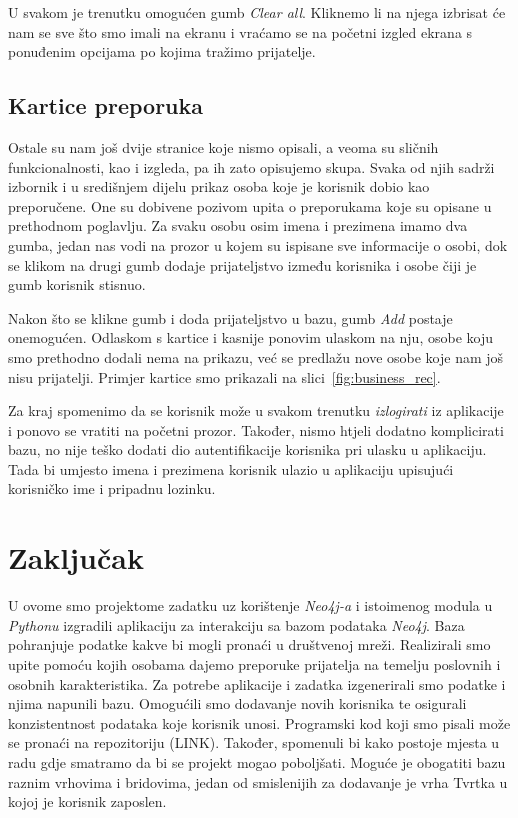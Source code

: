 \documentclass[titlepage, 12pt]{scrartcl}
\begin{document}
	U svakom je trenutku omogućen gumb \emph{Clear all}. Kliknemo li na njega izbrisat će nam se sve što smo imali na ekranu i vraćamo se na početni izgled ekrana s ponuđenim opcijama po kojima tražimo prijatelje.
	
	
	\subsection{Kartice preporuka}
	
	Ostale su nam još dvije stranice koje nismo opisali, a veoma su sličnih funkcionalnosti, kao i izgleda, pa ih zato opisujemo skupa. Svaka od njih sadrži izbornik i u središnjem dijelu prikaz osoba koje je korisnik dobio kao preporučene. One su dobivene pozivom upita o preporukama koje su opisane u prethodnom poglavlju. Za svaku osobu osim imena i prezimena imamo dva gumba, jedan nas vodi na prozor u kojem su ispisane sve informacije o osobi, dok se klikom na drugi gumb dodaje prijateljstvo između korisnika i osobe čiji je gumb korisnik stisnuo.
	
	Nakon što se klikne gumb i doda prijateljstvo u bazu, gumb \emph{Add} postaje onemogućen. Odlaskom s kartice i kasnije ponovim ulaskom na nju, osobe koju smo prethodno dodali nema na prikazu, već se predlažu nove osobe koje nam još nisu prijatelji. Primjer kartice smo prikazali na slici~\ref{fig:business_rec}.
	
	Za kraj spomenimo da se korisnik može u svakom trenutku \emph{izlogirati} iz aplikacije i ponovo se vratiti na početni prozor. Također, nismo htjeli dodatno komplicirati bazu, no nije teško dodati dio autentifikacije korisnika pri ulasku u aplikaciju. Tada bi umjesto imena i prezimena korisnik ulazio u aplikaciju upisujući korisničko ime i pripadnu lozinku. 
	
	\section{Zaključak}
	U ovome smo projektome zadatku uz korištenje \emph{Neo4j-a} i istoimenog modula u \emph{Pythonu} izgradili aplikaciju za interakciju sa bazom podataka \emph{Neo4j}. Baza pohranjuje podatke kakve bi mogli pronaći u društvenoj mreži. Realizirali smo upite pomoću kojih osobama dajemo preporuke  prijatelja na temelju poslovnih i osobnih karakteristika. Za potrebe aplikacije i zadatka izgenerirali smo podatke i njima napunili bazu. Omogućili smo dodavanje novih korisnika te osigurali konzistentnost podataka koje korisnik unosi. Programski kod koji smo pisali može se pronaći na repozitoriju (LINK). Također, spomenuli bi kako postoje mjesta u radu gdje smatramo da bi se projekt mogao poboljšati. Moguće je obogatiti bazu raznim vrhovima i bridovima, jedan od smislenijih za dodavanje je vrha Tvrtka u kojoj je korisnik zaposlen. 
	
\end{document}
